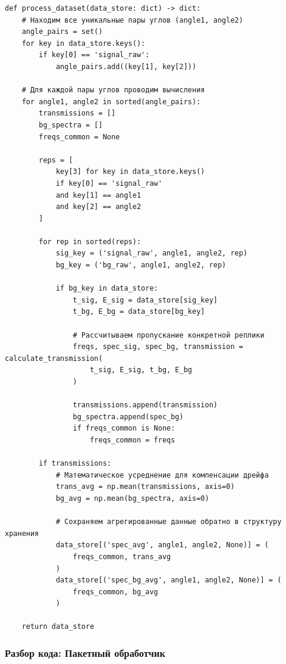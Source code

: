 \begin{listing}[H]
	\caption{Пакетная обработка базы данных ()}\label{lst:process_dataset}
	\begin{verbatim}
def process_dataset(data_store: dict) -> dict:
    # Находим все уникальные пары углов (angle1, angle2)
    angle_pairs = set()
    for key in data_store.keys():
        if key[0] == 'signal_raw':
            angle_pairs.add((key[1], key[2]))

    # Для каждой пары углов проводим вычисления
    for angle1, angle2 in sorted(angle_pairs):
        transmissions = []
        bg_spectra = []
        freqs_common = None

        reps = [
            key[3] for key in data_store.keys()
            if key[0] == 'signal_raw'
            and key[1] == angle1
            and key[2] == angle2
        ]

        for rep in sorted(reps):
            sig_key = ('signal_raw', angle1, angle2, rep)
            bg_key = ('bg_raw', angle1, angle2, rep)

            if bg_key in data_store:
                t_sig, E_sig = data_store[sig_key]
                t_bg, E_bg = data_store[bg_key]

                # Рассчитываем пропускание конкретной реплики
                freqs, spec_sig, spec_bg, transmission = calculate_transmission(
                    t_sig, E_sig, t_bg, E_bg
                )

                transmissions.append(transmission)
                bg_spectra.append(spec_bg)
                if freqs_common is None:
                    freqs_common = freqs

        if transmissions:
            # Математическое усреднение для компенсации дрейфа
            trans_avg = np.mean(transmissions, axis=0)
            bg_avg = np.mean(bg_spectra, axis=0)

            # Сохраняем агрегированные данные обратно в структуру хранения
            data_store[('spec_avg', angle1, angle2, None)] = (
                freqs_common, trans_avg
            )
            data_store[('spec_bg_avg', angle1, angle2, None)] = (
                freqs_common, bg_avg
            )

    return data_store
	\end{verbatim}
\end{listing}

\subsubsection{Разбор кода: Пакетный обработчик}


